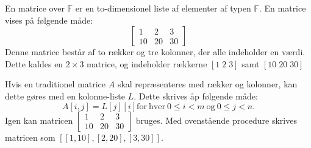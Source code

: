 En matrice over $\mathbb{F}$ er en to-dimensionel liste af elementer af typen $\mathbb{F}$.
En matrice vises på følgende måde:
$$\left[
\begin{matrix}
    1&2&3\\
    10&20&30
\end{matrix}
\right]
$$
Denne matrice består af to rækker og tre kolonner, der alle indeholder en værdi.
Dette kaldes en $2 \times 3$ matrice, og indeholder rækkerne $[1\;2\;3]$ samt $[10\;20\;30]$

Hvis en traditionel matrice $A$ skal repræsenteres med rækker og kolonner, kan dette gøres med en kolonne-liste $L$.
Dette skrives åp følgende måde:
\begin{equation}
    A\left[i,j\right] = L\left[j\right]\left[i\right]\mathrm{for\ hver\ }0\leq i<m\mathrm{\ og\ }0\leq j<n.
\end{equation}
Igen kan matricen $\left[\begin{matrix}1&2&3\\10&20&30\end{matrix}\right]$ bruges.
Med ovenstående procedure skrives matricen som $[[1,10],[2,20],[3,30]]$.


